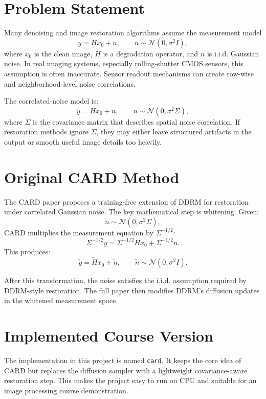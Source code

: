 \documentclass[12pt,a4paper]{article}
\begin{document}
\section{Problem Statement}

Many denoising and image restoration algorithms assume the measurement model
\[
  y = Hx_0 + n,
  \qquad
  n \sim \mathcal{N}(0, \sigma^2 I),
\]
where \(x_0\) is the clean image, \(H\) is a degradation operator, and \(n\) is
i.i.d. Gaussian noise. In real imaging systems, especially rolling-shutter CMOS
sensors, this assumption is often inaccurate. Sensor readout mechanisms can
create row-wise and neighborhood-level noise correlations.

The correlated-noise model is:
\[
  y = Hx_0 + n,
  \qquad
  n \sim \mathcal{N}(0, \sigma^2 \Sigma),
\]
where \(\Sigma\) is the covariance matrix that describes spatial noise
correlation. If restoration methods ignore \(\Sigma\), they may either leave
structured artifacts in the output or smooth useful image details too heavily.

\section{Original CARD Method}

The CARD paper proposes a training-free extension of DDRM for restoration under
correlated Gaussian noise. The key mathematical step is whitening. Given:
\[
  n \sim \mathcal{N}(0, \sigma^2 \Sigma),
\]
CARD multiplies the measurement equation by \(\Sigma^{-1/2}\):
\[
  \Sigma^{-1/2} y
  =
  \Sigma^{-1/2} Hx_0
  +
  \Sigma^{-1/2} n.
\]
This produces:
\[
  \tilde{y} = \tilde{H}x_0 + \tilde{n},
  \qquad
  \tilde{n} \sim \mathcal{N}(0, \sigma^2 I).
\]

After this transformation, the noise satisfies the i.i.d. assumption required by
DDRM-style restoration. The full paper then modifies DDRM's diffusion updates in
the whitened measurement space.

\section{Implemented Course Version}

The implementation in this project is named \texttt{card}. It keeps the core
idea of CARD but replaces the diffusion sampler with a lightweight
covariance-aware restoration step. This makes the project easy to run on CPU and
suitable for an image processing course demonstration.
\end{document}
